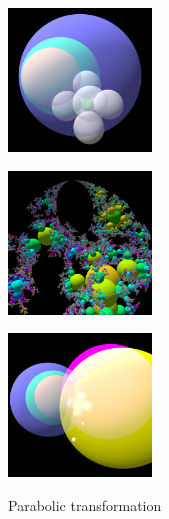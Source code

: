\begin{figure}[h!tbp]
 \begin{minipage}{0.49\hsize}
  \begin{minipage}{0.24\hsize}
   \center
   \includegraphics[width=1.5in, height=1.5in, keepaspectratio]{../img/klein/3diis/parabolicGen.pdf}
   \label{fig:parabolicGen3d}
  \end{minipage}
  \hspace*{\fill}
  \begin{minipage}{0.24\hsize}
   \center
   \includegraphics[width=1.5in, height=1.5in, keepaspectratio]{../img/klein/3diis/parabolicOrb.pdf}
   \label{fig:parabolicOrb3d}
  \end{minipage}
  \hspace*{\fill}
  \caption{Parabolic transformation}
  \label{fig:parabolic3d}
 \end{minipage}
 \begin{minipage}{0.49\hsize}
  \begin{minipage}{0.24\hsize}
   \center
   \includegraphics[width=1.5in, height=1.5in, keepaspectratio]{../img/klein/3diis/compLoxoGen.pdf}
   \label{fig:compLoxoGen}
  \end{minipage}
 \hspace*{\fill}
 \begin{minipage}{0.24\hsize}

\end{minipage}
\end{minipage}
\end{figure}
